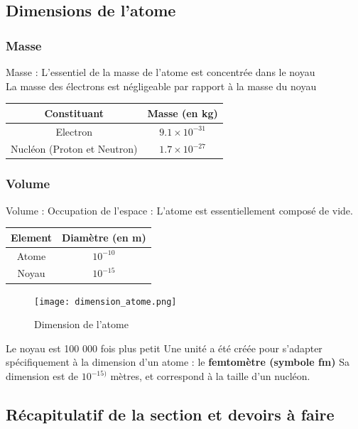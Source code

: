 \documentclass[a4paper,12pt]{article}
\begin{document}
\subsection{Dimensions de l'atome}

\subsubsection{Masse}

Masse : L'essentiel de la masse de l'atome est concentrée dans le noyau \\ 
La masse des électrons est négligeable par rapport à la masse du noyau

\vspace{1em}
\begin{tabular}{SS}
  \toprule
  {Constituant} & {Masse (en \si{kg})} \\
  \midrule
  {Electron} & {\(9.1 \times 10^{-31}\)} \\
  {Nucléon (Proton et Neutron)} & {\(1.7 \times 10^{-27}\)} \\
  \bottomrule
\end{tabular}

\subsubsection{Volume}

Volume : Occupation de l'espace : L'atome est essentiellement composé de vide. 

\vspace{1em}

\begin{tabular}{SS}
  \toprule
  {Element} & {Diamètre (en \si{m})} \\
  \midrule
  {Atome} & {\(10^{-10}\)} \\
  {Noyau} & {\(10^{-15}\)} \\
  \bottomrule
\end{tabular}


\begin{figure}[H]
  \centering
  \texttt{[image: dimension\_atome.png]}
  \caption{\label{} Dimension de l'atome}
\end{figure}

Le noyau est 100 000 fois plus petit
Une unité a été créée pour s'adapter spécifiquement à la dimension d'un atome : le \textbf{femtomètre (symbole fm)}
Sa dimension est de \(10^{-15)}\) mètres, et correspond à la taille d'un nucléon.


\subsection{Récapitulatif de la section et devoirs à faire}
\end{document}

